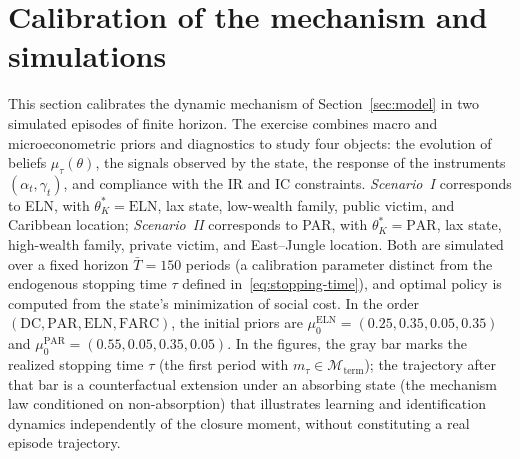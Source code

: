 \documentclass[ecta,nameyear,draft]{econsocart}
\theoremstyle{plain}
\theoremstyle{definition}
\newcommand{\1}{\mathbf{1}}
\begin{document}
\section{Calibration of the mechanism and simulations}\label{sec:calibracion}
\normalfont\normalsize
This section calibrates the dynamic mechanism of Section~\ref{sec:model} in two simulated episodes of finite horizon. The exercise combines macro and microeconometric priors and diagnostics to study four objects: the evolution of beliefs $\mu_\tau(\theta)$, the signals observed by the state, the response of the instruments $(\alpha_t,\gamma_t)$, and compliance with the IR and IC constraints. \emph{Scenario~I} corresponds to ELN, with $\theta_K^\ast=\mathrm{ELN}$, lax state, low-wealth family, public victim, and Caribbean location; \emph{Scenario~II} corresponds to PAR, with $\theta_K^\ast=\mathrm{PAR}$, lax state, high-wealth family, private victim, and East--Jungle location. Both are simulated over a fixed horizon $\bar{T}=150$ periods (a calibration parameter distinct from the endogenous stopping time $\tau$ defined in~\eqref{eq:stopping-time}), and optimal policy is computed from the state's minimization of social cost. In the order $(\mathrm{DC},\mathrm{PAR},\mathrm{ELN},\mathrm{FARC})$, the initial priors are $\mu_0^{\mathrm{ELN}}=(0.25,0.35,0.05,0.35)$ and $\mu_0^{\mathrm{PAR}}=(0.55,0.05,0.35,0.05)$. In the figures, the gray bar marks the realized stopping time $\tau$ (the first period with $m_\tau\in\mathcal{M}_{\mathrm{term}}$); the trajectory after that bar is a counterfactual extension under an absorbing state (the mechanism law conditioned on non-absorption) that illustrates learning and identification dynamics independently of the closure moment, without constituting a real episode trajectory.
\end{document}
